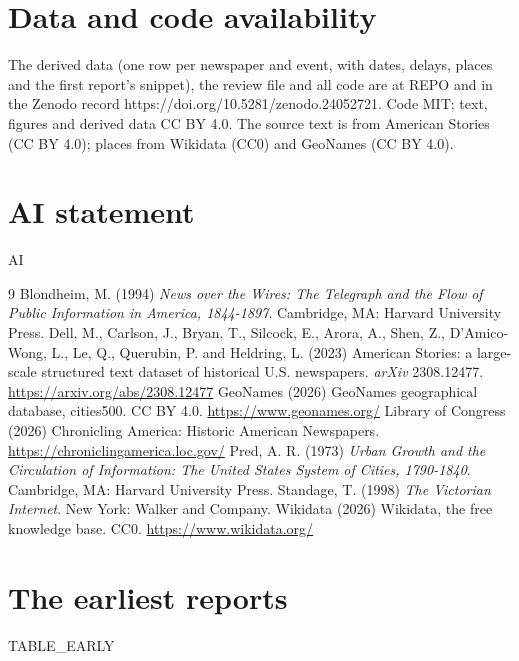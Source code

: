 \documentclass[11pt,a4paper]{article}
\begin{document}
\section*{Data and code availability}
The derived data (one row per newspaper and event, with dates, delays, places and the first report's snippet), the review file and all code are at {{REPO}} and in the Zenodo record https://doi.org/10.5281/zenodo.24052721. Code MIT; text, figures and derived data CC BY 4.0. The source text is from American Stories (CC BY 4.0); places from Wikidata (CC0) and GeoNames (CC BY 4.0).

\section*{AI statement}
{{AI}}

\begin{thebibliography}{9}
 Blondheim, M. (1994) \textit{News over the Wires: The Telegraph and the Flow of Public Information in America, 1844-1897}. Cambridge, MA: Harvard University Press.
 Dell, M., Carlson, J., Bryan, T., Silcock, E., Arora, A., Shen, Z., D'Amico-Wong, L., Le, Q., Querubin, P. and Heldring, L. (2023) American Stories: a large-scale structured text dataset of historical U.S. newspapers. \textit{arXiv} 2308.12477. \url{https://arxiv.org/abs/2308.12477}
 GeoNames (2026) GeoNames geographical database, cities500. CC BY 4.0. \url{https://www.geonames.org/}
 Library of Congress (2026) Chronicling America: Historic American Newspapers. \url{https://chroniclingamerica.loc.gov/}
 Pred, A. R. (1973) \textit{Urban Growth and the Circulation of Information: The United States System of Cities, 1790-1840}. Cambridge, MA: Harvard University Press.
 Standage, T. (1998) \textit{The Victorian Internet}. New York: Walker and Company.
 Wikidata (2026) Wikidata, the free knowledge base. CC0. \url{https://www.wikidata.org/}
\end{thebibliography}

\appendix
\section{The earliest reports}
{{TABLE_EARLY}}
\end{document}
